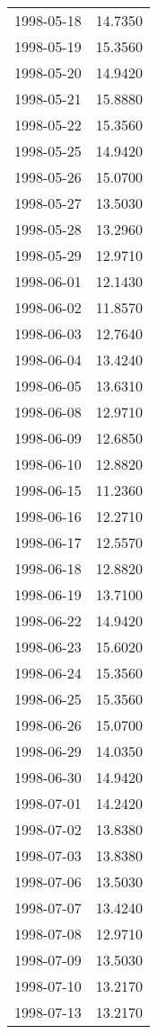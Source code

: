 \begin{tabular}{lr}
1998-05-18 &     14.7350 \\
1998-05-19 &     15.3560 \\
1998-05-20 &     14.9420 \\
1998-05-21 &     15.8880 \\
1998-05-22 &     15.3560 \\
1998-05-25 &     14.9420 \\
1998-05-26 &     15.0700 \\
1998-05-27 &     13.5030 \\
1998-05-28 &     13.2960 \\
1998-05-29 &     12.9710 \\
1998-06-01 &     12.1430 \\
1998-06-02 &     11.8570 \\
1998-06-03 &     12.7640 \\
1998-06-04 &     13.4240 \\
1998-06-05 &     13.6310 \\
1998-06-08 &     12.9710 \\
1998-06-09 &     12.6850 \\
1998-06-10 &     12.8820 \\
1998-06-15 &     11.2360 \\
1998-06-16 &     12.2710 \\
1998-06-17 &     12.5570 \\
1998-06-18 &     12.8820 \\
1998-06-19 &     13.7100 \\
1998-06-22 &     14.9420 \\
1998-06-23 &     15.6020 \\
1998-06-24 &     15.3560 \\
1998-06-25 &     15.3560 \\
1998-06-26 &     15.0700 \\
1998-06-29 &     14.0350 \\
1998-06-30 &     14.9420 \\
1998-07-01 &     14.2420 \\
1998-07-02 &     13.8380 \\
1998-07-03 &     13.8380 \\
1998-07-06 &     13.5030 \\
1998-07-07 &     13.4240 \\
1998-07-08 &     12.9710 \\
1998-07-09 &     13.5030 \\
1998-07-10 &     13.2170 \\
1998-07-13 &     13.2170 \\

\end{tabular}
